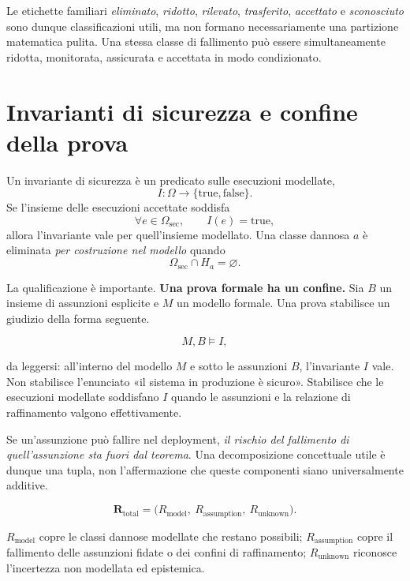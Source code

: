 \documentclass[10pt,oneside,openany]{book}
\begin{document}
Le etichette familiari \emph{eliminato}, \emph{ridotto}, \emph{rilevato}, \emph{trasferito}, \emph{accettato} e \emph{sconosciuto} sono dunque classificazioni utili, ma non formano necessariamente una partizione matematica pulita. Una stessa classe di fallimento può essere simultaneamente ridotta, monitorata, assicurata e accettata in modo condizionato.

\section{Invarianti di sicurezza e confine della prova}

Un invariante di sicurezza è un predicato sulle esecuzioni modellate,
\[
I:\Omega\rightarrow\{\mathrm{true},\mathrm{false}\}.
\]
Se l'insieme delle esecuzioni accettate soddisfa
\[
\forall e\in\Omega_{\mathrm{sec}},\qquad I(e)=\mathrm{true},
\]
allora l'invariante vale per quell'insieme modellato. Una classe dannosa $a$ è eliminata \emph{per costruzione nel modello} quando
\[
\Omega_{\mathrm{sec}}\cap H_a=\varnothing.
\]

La qualificazione è importante. \textbf{Una prova formale ha un confine.} Sia $B$ un insieme di assunzioni esplicite e $M$ un modello formale. Una prova stabilisce un giudizio della forma seguente.
\begin{formulabox}
\[
M, B \models I,
\]
\end{formulabox}
da leggersi: all'interno del modello $M$ e sotto le assunzioni $B$, l'invariante $I$ vale. Non stabilisce l'enunciato «il sistema in produzione è sicuro». Stabilisce che le esecuzioni modellate soddisfano $I$ quando le assunzioni e la relazione di raffinamento valgono effettivamente.

Se un'assunzione può fallire nel deployment, \emph{il rischio del fallimento di quell'assunzione sta fuori dal teorema}. Una decomposizione concettuale utile è dunque una tupla, non l'affermazione che queste componenti siano universalmente additive.
\begin{formulabox}
\[
\mathbf{R}_{\mathrm{total}}=\bigl(R_{\mathrm{model}},\ R_{\mathrm{assumption}},\ R_{\mathrm{unknown}}\bigr).
\]
\end{formulabox} $R_{\mathrm{model}}$ copre le classi dannose modellate che restano possibili; $R_{\mathrm{assumption}}$ copre il fallimento delle assunzioni fidate o dei confini di raffinamento; $R_{\mathrm{unknown}}$ riconosce l'incertezza non modellata ed epistemica.
\end{document}
